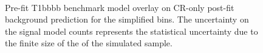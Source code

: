 \begin{figure}[h!]
    \begin{center}
         \\
        \caption{
            Pre-fit T1bbbb benchmark model overlay on CR-only post-fit
            background prediction for the simplified bins. The uncertainty on
            the signal model counts represents the statistical uncertainty due
            to the finite size of the of the simulated sample.
        }
        \label{fig:T1bbbb_MR_simp}
    \end{center}
\end{figure}

